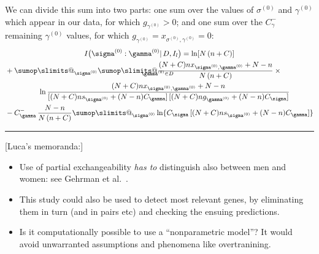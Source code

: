 \documentclass[\ifafour a4paper,12pt,\else a5paper,10pt,\fi%
onecolumn,oneside,article,%
british%
]{memoir}
\makeatletter
\theoremstyle{remark}
\theoremstyle{innote}
\def\sum{\DOTSI\sumop\slimits@}
\newcommand*{\citey}{\parencites*}
\DeclarePairedDelimiter\set{\{}{\}}
\renewcommand*{\|}{\mathpunct{|}}
\newcommand*{\etal}{{et al.}}
\newcommand*{\dob}{degree of belief}
\newcommand*{\yD}{D}
\newcommand*{\mI}{I}
\newcommand*{\ys}{\sigma}
\newcommand*{\yg}{\gamma}
\newcommand*{\gn}{l}
\newcommand*{\ysi}[1]{\ys^{(#1)}}
\newcommand*{\ygi}[1]{\yg^{(#1)}}
\newcommand*{\yso}{\ysi{0}}
\newcommand*{\ygo}{\ygi{0}}
\newcommand*{\yCs}{C_{\sigma}}
\newcommand*{\yCg}{C_{\gamma}}
\newcommand*{\yIc}{I_{\gn}}
\newcommand*{\yCgn}{\yCg^{-}}
\makeatother
\begin{document}
We can divide this sum into two parts: one sum over the values of $\yso$
and $\ygo$ which appear in our data, for which $g_{\ygo}>0$; and one sum
over the $\yCgn$ remaining $\ygo$ values,  for which $g_{\ygo}=x_{\yso,\ygo}=0$:
\begin{multline}
  \label{eq:mutual_info_final_three}
  \mI\bigl( \yso : \ygo \| \yD,\yIc \bigr) =
  \ln[N\,(n+C)] \\
  \begin{aligned}[b]
  &+
    \!\begin{multlined}[t][0.92\linewidth]
\sum_{\yso}
\sum_{\mathclap{\ygo \in \yD}}
  \frac{(N+C) n x_{\yso, \ygo}+N-n}{N\,(n+C)}\times{}\\
  \ln\frac{(N+C) n x_{\yso, \ygo}+N-n}{
    [(N+C) n s_{\yso}+(N-n)\yCg]\,
    [(N+C) n g_{\ygo}+(N-n)\yCs]
  } 
\end{multlined}
    \\
    &-\yCgn\,
      \frac{N-n}{N\,(n+C)}\sum_{\yso}\ln\{\yCs\,[(N+C) n s_{\yso}+(N-n)\yCg]\}
  \end{aligned}
\end{multline}

\bigskip
\hrule
[Luca's memoranda:]
\begin{itemize}
\item Use of partial exchangeability \emph{has to} distinguish also between
  men and women: see Gehrman \etal\ \citey[p.~327]{gehrmanetal2013}.
\item This study could also be used to detect most relevant genes, by
  eliminating them in turn (and in pairs etc) and checking the ensuing
  predictions.
\item Is it computationally possible to use a \enquote{nonparametric
    model}? It would avoid unwarranted assumptions and phenomena like
  overtranining.
\end{itemize}
\end{document}
